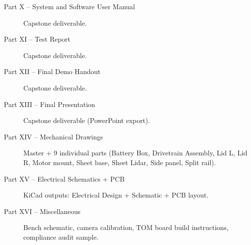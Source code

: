 \documentclass[11pt,letterpaper]{article}
\begin{document}
\begin{description}
\item[Part X -- System and Software User Manual] Capstone deliverable.

\item[Part XI -- Test Report] Capstone deliverable.

\item[Part XII -- Final Demo Handout] Capstone deliverable.

\item[Part XIII -- Final Presentation] Capstone deliverable (PowerPoint
export).

\item[Part XIV -- Mechanical Drawings] Master + 9 individual parts
(Battery Box, Drivetrain Assembly, Lid L, Lid R, Motor mount, Sheet base,
Sheet Lidar, Side panel, Split rail).

\item[Part XV -- Electrical Schematics + PCB] KiCad outputs: Electrical
Design + Schematic + PCB layout.

\item[Part XVI -- Miscellaneous] Bench schematic, camera calibration,
TOM board build instructions, compliance audit sample.
\end{description}
\end{document}
